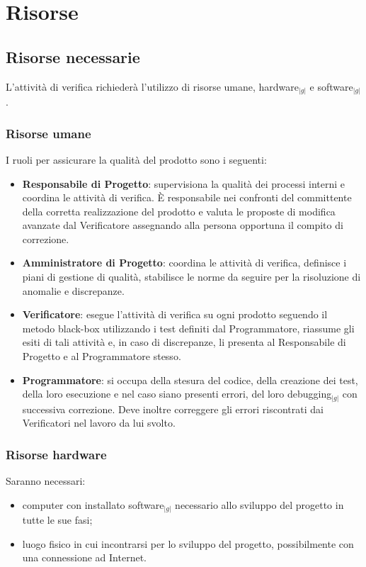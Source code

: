 \section{Risorse}{
    \subsection{Risorse necessarie}{
	  L'attività di verifica richiederà l'utilizzo di risorse umane, hardware$_{|g|}$ e software$_{|g|}$.
	  \subsubsection{Risorse umane}{
	      I ruoli per assicurare la qualità del prodotto sono i seguenti:
	      \begin{itemize}
		  \item \textbf{Responsabile di Progetto}: supervisiona la qualità dei processi interni e coordina le attività di verifica. \`E
			responsabile nei confronti del committente della corretta realizzazione del prodotto e valuta le proposte di modifica avanzate
			dal Verificatore assegnando alla persona opportuna il compito di correzione.
		  \item \textbf{Amministratore di Progetto}: coordina le attività di verifica, definisce i piani di gestione di qualità, stabilisce
			le norme da seguire per la risoluzione di anomalie e discrepanze. 
		  \item \textbf{Verificatore}: esegue l'attività di verifica su ogni prodotto seguendo il metodo black-box utilizzando i test definiti dal Programmatore,
			riassume gli esiti di tali attività e, in caso di discrepanze, li presenta al Responsabile di Progetto e al Programmatore stesso.
		  \item \textbf{Programmatore}: si occupa della stesura del codice, della creazione dei test, della loro esecuzione e nel caso siano presenti errori, del loro debugging$_{|g|}$ con successiva correzione. Deve inoltre correggere gli errori riscontrati dai Verificatori nel lavoro da lui svolto.
	      \end{itemize}
	  }

	  \subsubsection{Risorse hardware}{
	      Saranno necessari:
	      \begin{itemize}
		  \item computer con installato software$_{|g|}$ necessario allo sviluppo del progetto in tutte le sue fasi;
		  \item luogo fisico in cui incontrarsi per lo sviluppo del progetto, possibilmente con una connessione ad Internet.
	      \end{itemize}
	  }

}}
